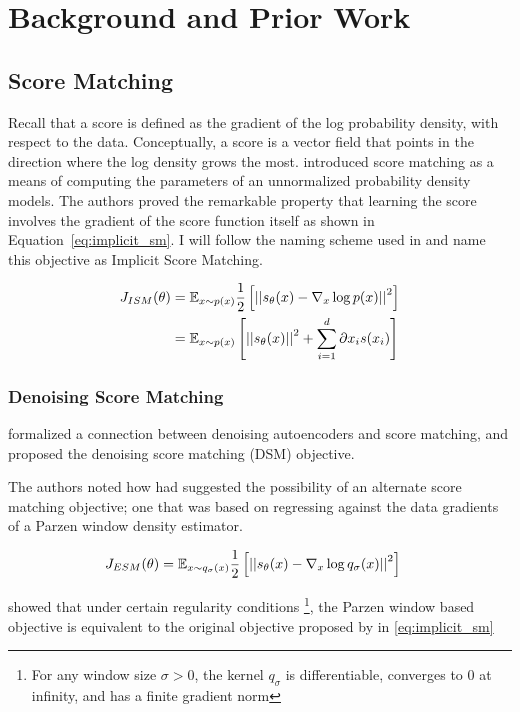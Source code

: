 \chapter{Background and Prior Work}

\section{Score Matching}
Recall that a score is defined as the gradient of the log probability density, with respect to the data. Conceptually, a score is a vector field that points in the direction where the log density grows the most. 
 introduced score matching as a means of computing the parameters of an unnormalized probability density models. The authors proved the remarkable property that learning the score involves the gradient of the score function itself as shown in Equation~\ref{eq:implicit_sm}. I will follow the naming scheme used in  and name this objective as Implicit Score Matching.

\begin{align}
\label{eq:implicit_sm}
    J_{ISM}(\theta) &= \mathbb{E}_{x \sim p(x)} \frac{1}{2} \left[ { \left|\left| {s_\theta(x) - \nabla_x \log p(x) } \right|\right|^2 } \right] \\
    &= \mathbb{E}_{x \sim p(x)} \left[ { \left|\left| {s_\theta(x)} \right|\right|^2 + \sum^{d}_{i=1}{\partial{x_{i}} s(x_{i}) } } \right]
\end{align}


\subsection{Denoising Score Matching}

 formalized a connection between denoising autoencoders and score matching, and proposed the denoising score matching (DSM) objective.

The authors noted how  had suggested the possibility of an alternate score matching objective; one that was based on regressing against the data gradients of a Parzen window density estimator.

\begin{align}
\label{eq:explicit_sm}
    J_{ESM}(\theta) &= \mathbb{E}_{x \sim q_{\sigma}(x)} \frac{1}{2} \left[ { \left|\left| {s_\theta(x) - \nabla_x \log q_{\sigma}(x) } \right|\right|^2 } \right]
\end{align}

 showed that under certain regularity conditions
\footnote{For any window size $\sigma > 0$, the kernel $q_{\sigma}$ is differentiable, converges to 0 at infinity, and has a finite gradient norm},
the Parzen window based objective is equivalent to the original objective proposed by  in \eqref{eq:implicit_sm}

